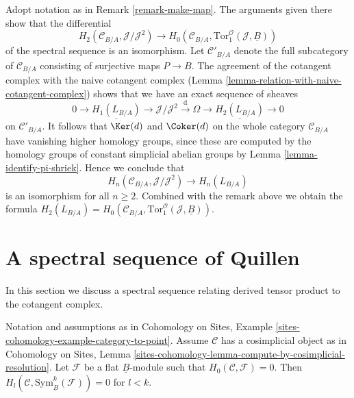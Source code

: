 \begin{remark}
\label{remark-surjection}
Adopt notation as in Remark \ref{remark-make-map}. The arguments given
there show that the differential
$$
H_2(\mathcal{C}_{B/A}, \mathcal{J}/\mathcal{J}^2)
\longrightarrow
H_0(\mathcal{C}_{B/A}, \text{Tor}_1^\mathcal{O}(\mathcal{J}, \underline{B}))
$$
of the spectral sequence is an isomorphism. Let $\mathcal{C}'_{B/A}$
denote the full subcategory of $\mathcal{C}_{B/A}$ consisting of surjective
maps $P \to B$. The agreement of the cotangent complex with the naive
cotangent complex (Lemma \ref{lemma-relation-with-naive-cotangent-complex})
shows that we have an exact sequence of sheaves
$$
0 \to \underline{H_1(L_{B/A})} \to
\mathcal{J}/\mathcal{J}^2 \xrightarrow{\text{d}} \Omega \to
\underline{H_2(L_{B/A})} \to 0
$$
on $\mathcal{C}'_{B/A}$. It follows that $\Ker(d)$ and
$\Coker(d)$ on the whole category $\mathcal{C}_{B/A}$ have
vanishing higher homology groups, since
these are computed by the homology groups of constant simplicial abelian
groups by Lemma \ref{lemma-identify-pi-shriek}. Hence we conclude
that
$$
H_n(\mathcal{C}_{B/A}, \mathcal{J}/\mathcal{J}^2) \to H_n(L_{B/A})
$$
is an isomorphism for all $n \geq 2$. Combined with the remark above
we obtain the formula
$H_2(L_{B/A}) =
H_0(\mathcal{C}_{B/A}, \text{Tor}_1^\mathcal{O}(\mathcal{J}, \underline{B}))$.
\end{remark}





\section{A spectral sequence of Quillen}
\label{section-spectral-sequence}

\noindent
In this section we discuss a spectral sequence relating derived
tensor product to the cotangent complex.

\begin{lemma}
\label{lemma-vanishing-symmetric-powers}
Notation and assumptions as in
Cohomology on Sites, Example \ref{sites-cohomology-example-category-to-point}.
Assume $\mathcal{C}$ has a cosimplicial object as in
Cohomology on Sites, Lemma
\ref{sites-cohomology-lemma-compute-by-cosimplicial-resolution}.
Let $\mathcal{F}$ be a flat $\underline{B}$-module such that
$H_0(\mathcal{C}, \mathcal{F}) = 0$.
Then $H_l(\mathcal{C}, \text{Sym}_{\underline{B}}^k(\mathcal{F})) = 0$
for $l < k$.
\end{lemma}


